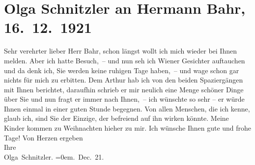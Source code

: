 

         
         \renewcommand{\erwaehntePersonen}{Personen: Hermann Bahr, Olga Schnitzler, Lili Schnitzler, Heinrich Schnitzler}
         \renewcommand{\erwaehnteOrte}{Orte: Salzburg, Wien}
         \renewcommand{\erwaehnteWerke}{}
               \section[Olga Schnitzler an Hermann Bahr, 16. 12. 1921]{ Olga Schnitzler an Hermann Bahr, 16. 12. 1921}\nopagebreak{}\rehead{ }\begin{ledgroupsized}[t]{13cm}\normalsize\beginnumbering \toendnotes[C]{\smallbreak\pagebreak[2]} 
\toendnotes[C]{\smallbreak}\pstart{}{\pb}Sehr verehrter
                  lieber Herr Bahr,\pend\pstart
           schon längst wollt ich mich wieder bei Ihnen melden. Aber ich hatte Besuch, – und nun
               seh ich Wiener Gesichter auftauchen und da denk
               ich, Sie werden keine ruhigen Tage haben, – und wage schon gar nichts für mich zu
               erbitten.\pend
           \pstart
           Dem Arthur hab ich von den beiden Spaziergängen
               mit Ihnen berichtet, daraufhin schrieb er mir neulich eine Menge schöner Dinge über
               Sie und nun fragt er immer nach Ihnen, – ich wünschte so sehr – er würde Ihnen einmal
               in einer guten Stunde begegnen. Von allen Menschen, die ich kenne, glaub ich, sind
               Sie der Einzige, der befreiend auf ihn wirken könnte.\pend
           \pstart
           Meine Kinder kommen
               zu Weihnachten hieher zu mir.\pend
           \pstart
           {\pb}Ich wünsche Ihnen gute
               und frohe Tage! \pend
           \pstart
           Von Herzen ergeben{\\[\baselineskip]}Ihre{\\[\baselineskip]}\spacefill\mbox{Olga Schnitzler.}\pend
           \leftskip=0em{}. Dec. 21.\pend
           

\end{ledgroupsized}
